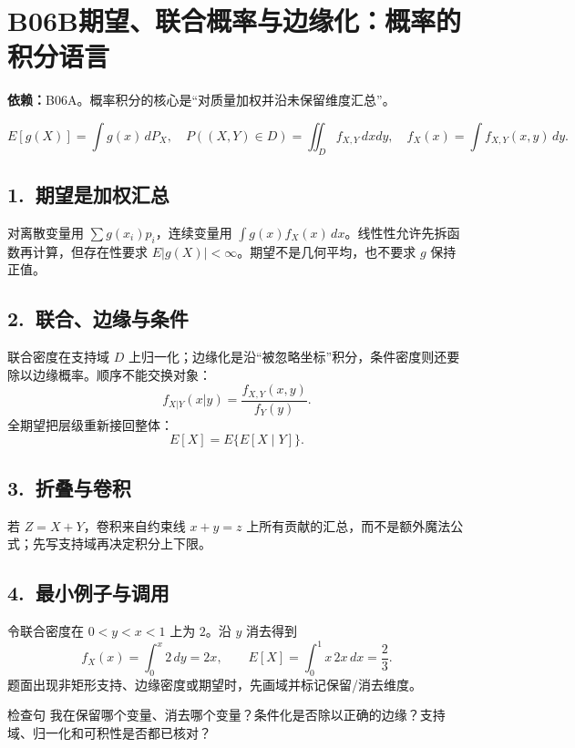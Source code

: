 \documentclass[UTF8,a4paper,10pt]{ctexart}
\begin{document}
\section*{B06B\quad 期望、联合概率与边缘化：概率的积分语言}
\textbf{依赖：}B06A。概率积分的核心是“对质量加权并沿未保留维度汇总”。
\begin{tcolorbox}[title=母接口]
\[
E[g(X)]=\int g(x)\,dP_X,\quad
P((X,Y)\in D)=\iint_D f_{X,Y}\,dxdy,\quad
f_X(x)=\int f_{X,Y}(x,y)\,dy.
\]
\end{tcolorbox}
\subsection*{1.\ 期望是加权汇总}
对离散变量用 $\sum g(x_i)p_i$，连续变量用 $\int g(x)f_X(x)\,dx$。线性性允许先拆函数再计算，但存在性要求 $E|g(X)|<\infty$。期望不是几何平均，也不要求 $g$ 保持正值。
\subsection*{2.\ 联合、边缘与条件}
联合密度在支持域 $D$ 上归一化；边缘化是沿“被忽略坐标”积分，条件密度则还要除以边缘概率。顺序不能交换对象：
\[
f_{X|Y}(x|y)=\frac{f_{X,Y}(x,y)}{f_Y(y)}.
\]
全期望把层级重新接回整体：
\[
E[X]=E\{E[X\mid Y]\}.
\]
\subsection*{3.\ 折叠与卷积}
若 $Z=X+Y$，卷积来自约束线 $x+y=z$ 上所有贡献的汇总，而不是额外魔法公式；先写支持域再决定积分上下限。
\subsection*{4.\ 最小例子与调用}
令联合密度在 $0<y<x<1$ 上为 $2$。沿 $y$ 消去得到
\[
f_X(x)=\int_0^x2\,dy=2x,\qquad E[X]=\int_0^1x\,2x\,dx=\frac23.
\]
题面出现非矩形支持、边缘密度或期望时，先画域并标记保留/消去维度。
\begin{corebox}{检查句}
我在保留哪个变量、消去哪个变量？条件化是否除以正确的边缘？支持域、归一化和可积性是否都已核对？
\end{corebox}
\end{document}
